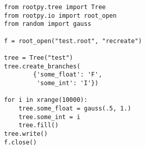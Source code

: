 \begin{footnotesize}
\begin{verbatim}
from rootpy.tree import Tree
from rootpy.io import root_open
from random import gauss

f = root_open("test.root", "recreate")

tree = Tree("test")
tree.create_branches(
        {'some_float': 'F',
         'some_int': 'I'})

for i in xrange(10000):
    tree.some_float = gauss(.5, 1.)
    tree.some_int = i
    tree.fill()
tree.write()
f.close()
\end{verbatim}
\end{footnotesize}
